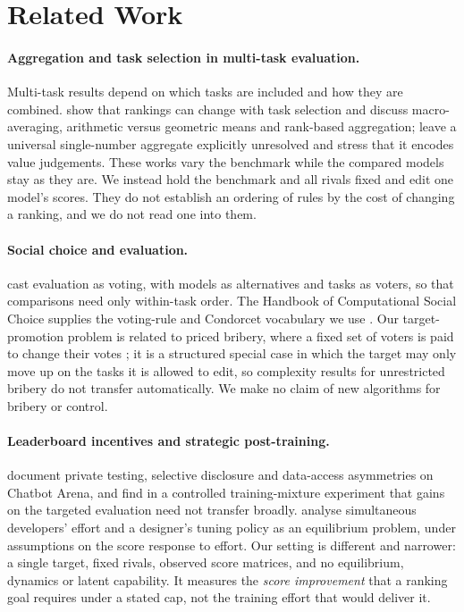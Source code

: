 \section{Related Work}
\label{sec:related}

\paragraph{Aggregation and task selection in multi-task evaluation.}
Multi-task results depend on which tasks are included and how they are combined.
\citet{dehghani2021lottery} show that rankings can change with task selection and discuss macro-averaging, arithmetic versus geometric means and rank-based aggregation; \citet{liang2023helm} leave a universal single-number aggregate explicitly unresolved and stress that it encodes value judgements.
These works vary the benchmark while the compared models stay as they are. We instead hold the benchmark and all rivals fixed and edit one model's scores.
They do not establish an ordering of rules by the cost of changing a ranking, and we do not read one into them.

\paragraph{Social choice and evaluation.}
\citet{lanctot2023vase} cast evaluation as voting, with models as alternatives and tasks as voters, so that comparisons need only within-task order. The Handbook of Computational Social Choice \citep{brandt2016handbook} supplies the voting-rule and Condorcet vocabulary we use \citep{zwicker2016voting}.
Our target-promotion problem is related to priced bribery, where a fixed set of voters is paid to change their votes \citep{faliszewski2016control}; it is a structured special case in which the target may only move up on the tasks it is allowed to edit, so complexity results for unrestricted bribery do not transfer automatically.
We make no claim of new algorithms for bribery or control.

\paragraph{Leaderboard incentives and strategic post-training.}
\citet{singh2025illusion} document private testing, selective disclosure and data-access asymmetries on Chatbot Arena, and find in a controlled training-mixture experiment that gains on the targeted evaluation need not transfer broadly.
\citet{chen2026incentives} analyse simultaneous developers' effort and a designer's tuning policy as an equilibrium problem, under assumptions on the score response to effort.
Our setting is different and narrower: a single target, fixed rivals, observed score matrices, and no equilibrium, dynamics or latent capability.
It measures the \emph{score improvement} that a ranking goal requires under a stated cap, not the training effort that would deliver it.

